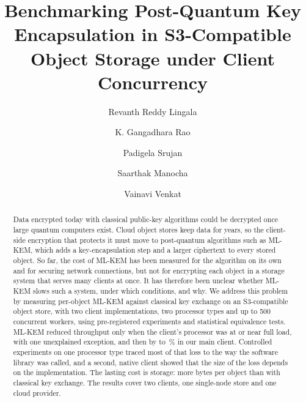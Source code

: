\documentclass[review,12pt]{elsarticle}
\begin{document}
\begin{frontmatter}

\title{Benchmarking Post-Quantum Key Encapsulation in S3-Compatible Object Storage under Client Concurrency}

\author[cbit]{Revanth Reddy Lingala}
\author[cbit]{K. Gangadhara Rao}
\author[cbit]{Padigela Srujan}
\author[cbit]{Saarthak Manocha}
\author[cbit]{Vainavi Venkat}



\begin{abstract}
Data encrypted today with classical public-key algorithms could be decrypted once large quantum
computers exist. Cloud object stores keep data for years, so the client-side encryption that
protects it must move to post-quantum algorithms such as ML-KEM, which adds a key-encapsulation
step and a larger ciphertext to every stored object. So far, the cost of ML-KEM has been
measured for the algorithm on its own and for securing network connections, but not for
encrypting each object in a storage system that serves many clients at once. It has therefore
been unclear whether ML-KEM slows such a system, under which conditions, and why. We address
this problem by measuring per-object ML-KEM against classical key exchange on an S3-compatible
object store, with two client implementations, two processor types and up to 500 concurrent
workers, using pre-registered experiments and statistical equivalence tests. ML-KEM reduced
throughput only when the client's processor was at or near full load, with one unexplained
exception, and then by \RevHotDeficit{} to \ArmHotDeficit\,\% in our main client. Controlled
experiments on one processor type traced most of that loss to the way the software library was
called, and a second, native client showed that the size of the loss depends on the
implementation. The lasting cost is storage: \RevMetaIntrinsic{} more bytes per object than with
classical key exchange. The
results cover two clients, one single-node store and one cloud provider.
\end{abstract}


\end{frontmatter}
\end{document}
